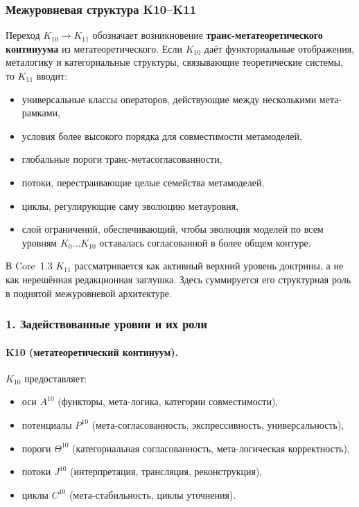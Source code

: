 
\subsubsection{Межуровневая структура K10–K11}
\label{sec:crossk-k10-k11}

Переход $K_{10} \rightarrow K_{11}$ обозначает возникновение
\textbf{транс-метатеоретического континуума} из метатеоретического.
Если $K_{10}$ даёт функториальные отображения, металогику и категориальные
структуры, связывающие теоретические системы, то $K_{11}$ вводит:
\begin{itemize}
  \item универсальные классы операторов, действующие между несколькими
        мета-рамками,
  \item условия более высокого порядка для совместимости метамоделей,
  \item глобальные пороги транс-метасогласованности,
  \item потоки, перестраивающие целые семейства метамоделей,
  \item циклы, регулирующие саму эволюцию метауровня,
  \item слой ограничений, обеспечивающий, чтобы эволюция моделей по всем уровням
        $K_0\dots K_{10}$ оставалась согласованной в более общем контуре.
\end{itemize}

В Core~1.3 $K_{11}$ рассматривается как активный верхний уровень доктрины, а не
как нерешённая редакционная заглушка. Здесь суммируется его структурная роль в
поднятой межуровневой архитектуре.

\subsubsection{1. Задействованные уровни и их роли}

\paragraph{K10 (метатеоретический континуум).}
$K_{10}$ предоставляет:
\begin{itemize}
  \item оси $A^{10}$ (функторы, мета-логика, категории совместимости),
  \item потенциалы $P^{10}$ (мета-согласованность, экспрессивность, универсальность),
  \item пороги $\Theta^{10}$ (категориальная согласованность,
        мета-логическая корректность),
  \item потоки $J^{10}$ (интерпретация, трансляция, реконструкция),
  \item циклы $C^{10}$ (мета-стабильность, циклы уточнения).
\end{itemize}

